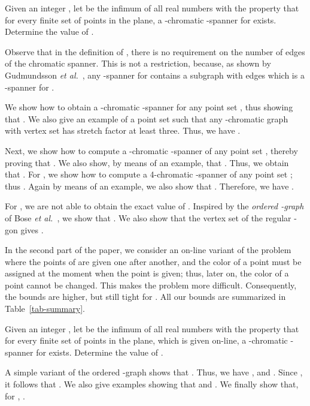 \documentclass[pdftex,leqno,fleqn,12pts]{llncs}
\begin{document}
\begin{problem}
\label{prob-k-col}
Given an integer , let  be the infimum of all real
numbers  with the property that for every finite set  of points in 
the plane, a -chromatic -spanner for  exists. Determine 
the value of .
\end{problem}

Observe that in the definition of , there is no requirement on 
the number of edges of the chromatic spanner. This is not a restriction, 
because, as shown by Gudmundsson \emph{et al.}~\cite{glns-adogg-02}, 
any -spanner for  contains a subgraph with  edges which 
is a -spanner for .    

We show 
how to obtain a -chromatic -spanner for any point set , 
thus showing that . 
We also give an example of a point set  such that any -chromatic 
graph with vertex set  has stretch factor at least three. Thus, 
we have . 

Next, we show how to compute a -chromatic -spanner of any point set ,
thereby proving that . 
We also show, by means of an example, that . Thus, 
we obtain that .  For , we show how to compute a 4-chromatic -spanner of any point set ; 
thus  .      
Again by means of an example, we also show that . 
Therefore, we have . 

For , we are not able to obtain the exact value of . 
Inspired by the \emph{ordered -graph} of 
Bose \emph{et al.}~\cite{bose04a}, we show that 
. We also show that the 
vertex set of the regular -gon gives 
. 

In the second part of the paper, we consider an on-line variant of the 
problem where the points of  are given one after another, and the 
color of a point must be assigned at the moment when the point is given; 
thus, later on, the color of a point cannot be changed.
This makes the problem more difficult.
Consequently, the bounds are higher, but still tight for . All our bounds are 
summarized in Table~\ref{tab-summary}.

\begin{problem}
\label{prob-k-colonline}
Given an integer , let  be the infimum of all real
numbers  with the property that for every finite set  of points in 
the plane, which is given on-line, a -chromatic -spanner for 
 exists. Determine the value of .
\end{problem}

A simple variant of the ordered -graph shows that 
. Thus, we have 
,  and . 
Since , it follows that . 
We also give examples showing that  and 
. We finally show that, for ,   
. 
\end{document}
